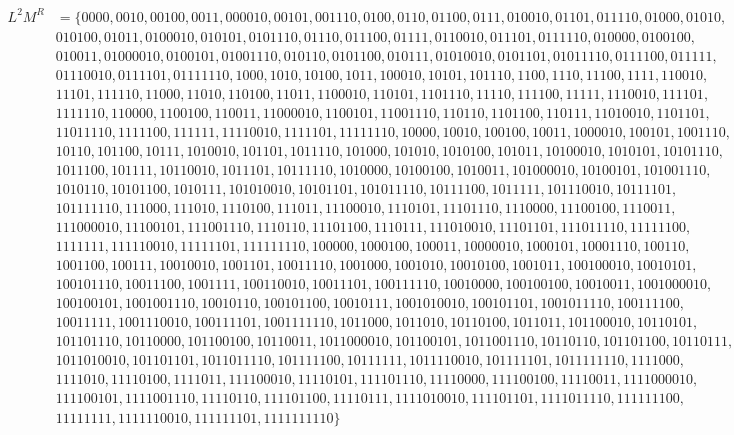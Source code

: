 \documentclass{article}
\begin{document}
\begin{enumerate}
{\begin{enumerate}
{\begin{align*}
L^2M^R &= \{0000, 0010, 00100, 0011, 000010, 00101, 001110, 0100, 0110, 01100, 0111, 010010, 01101, 011110, 01000, 01010,&\\ &010100, 01011, 0100010, 010101, 0101110, 01110, 011100, 01111, 0110010, 011101, 0111110, 010000, 0100100,&\\ &010011, 01000010, 0100101, 01001110, 010110, 0101100, 010111, 01010010, 0101101, 01011110, 0111100, 011111,&\\ &01110010, 0111101, 01111110, 1000, 1010, 10100, 1011, 100010, 10101, 101110, 1100, 1110, 11100, 1111, 110010,&\\ &11101, 111110, 11000, 11010, 110100, 11011, 1100010, 110101, 1101110, 11110, 111100, 11111, 1110010, 111101,&\\ &1111110, 110000, 1100100, 110011, 11000010, 1100101, 11001110, 110110, 1101100, 110111, 11010010, 1101101,&\\ &11011110, 1111100, 111111, 11110010, 1111101, 11111110, 10000, 10010, 100100, 10011, 1000010, 100101, 1001110,&\\ &10110, 101100, 10111, 1010010, 101101, 1011110, 101000, 101010, 1010100, 101011, 10100010, 1010101, 10101110,&\\ &1011100, 101111, 10110010, 1011101, 10111110, 1010000, 10100100, 1010011, 101000010, 10100101, 101001110,&\\ &1010110, 10101100, 1010111, 101010010, 10101101, 101011110, 10111100, 1011111, 101110010, 10111101,&\\ &101111110, 111000, 111010, 1110100, 111011, 11100010, 1110101, 11101110,1110000, 11100100, 1110011,&\\ &111000010, 11100101, 111001110, 1110110, 11101100, 1110111, 111010010, 11101101, 111011110, 11111100,&\\ &1111111, 111110010, 11111101, 111111110,100000, 1000100, 100011, 10000010, 1000101, 10001110, 100110,&\\ &1001100, 100111, 10010010, 1001101, 10011110, 1001000, 1001010, 10010100, 1001011, 100100010, 10010101,&\\ &100101110, 10011100, 1001111, 100110010, 10011101, 100111110, 10010000, 100100100,10010011, 1001000010,&\\ &100100101, 1001001110, 10010110, 100101100, 10010111, 1001010010, 100101101, 1001011110, 100111100,&\\ &10011111, 1001110010, 100111101, 1001111110,1011000, 1011010, 10110100, 1011011, 101100010, 10110101,&\\ &101101110, 10110000,101100100, 10110011, 1011000010, 101100101, 1011001110, 10110110, 101101100, 10110111,&\\ &1011010010, 101101101, 1011011110, 101111100, 10111111, 1011110010, 101111101,1011111110, 1111000,&\\ &1111010, 11110100, 1111011, 111100010, 11110101, 111101110,11110000, 111100100, 11110011, 1111000010,&\\ &111100101, 1111001110, 11110110, 111101100,11110111, 1111010010, 111101101, 1111011110, 111111100,&\\ &11111111, 1111110010,111111101, 1111111110 \}&

\end{align*}}
\end{enumerate}}
\end{enumerate}
\end{document}
